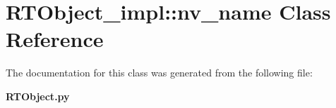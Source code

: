 \section{RTObject\_\-impl::nv\_\-name Class Reference}
\label{classRTObject__impl_1_1nv__name}


The documentation for this class was generated from the following file:\begin{CompactItemize}
\item 
{\bf RTObject.py}\end{CompactItemize}
